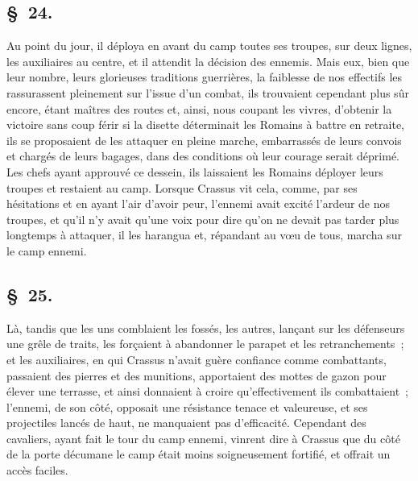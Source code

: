 \documentclass[french,twoside]{book} %
\begin{document}
\subsection[{§ 24.}]{ \textsc{§ 24.} }
\noindent Au point du jour, il déploya en avant du camp toutes ses troupes, sur deux lignes, les auxiliaires au centre, et il attendit la décision des ennemis. Mais eux, bien que leur nombre, leurs glorieuses traditions guerrières, la faiblesse de nos effectifs les rassurassent pleinement sur l’issue d’un combat, ils trouvaient cependant plus sûr encore, étant maîtres des routes et, ainsi, nous coupant les vivres, d’obtenir la victoire sans coup férir si la disette déterminait les Romains à battre en retraite, ils se proposaient de les attaquer en pleine marche, embarrassés de leurs convois et chargés de leurs bagages, dans des conditions où leur courage serait déprimé. Les chefs ayant approuvé ce dessein, ils laissaient les Romains déployer leurs troupes et restaient au camp. Lorsque Crassus vit cela, comme, par ses hésitations et en ayant l’air d’avoir peur, l’ennemi avait excité l’ardeur de nos troupes, et qu’il n’y avait qu’une voix pour dire qu’on ne devait pas tarder plus longtemps à attaquer, il les harangua et, répandant au vœu de tous, marcha sur le camp ennemi.
\subsection[{§ 25.}]{ \textsc{§ 25.} }
\noindent Là, tandis que les uns comblaient les fossés, les autres, lançant sur les défenseurs une grêle de traits, les forçaient à abandonner le parapet et les retranchements ; et les auxiliaires, en qui Crassus n’avait guère confiance comme combattants, passaient des pierres et des munitions, apportaient des mottes de gazon pour élever une terrasse, et ainsi donnaient à croire qu’effectivement ils combattaient ; l’ennemi, de son côté, opposait une résistance tenace et valeureuse, et ses projectiles lancés de haut, ne manquaient pas d’efficacité. Cependant des cavaliers, ayant fait le tour du camp ennemi, vinrent dire à Crassus que du côté de la porte décumane le camp était moins soigneusement fortifié, et offrait un accès faciles.
\end{document}
